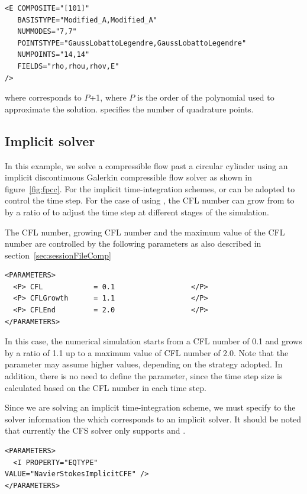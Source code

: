 \begin{lstlisting}[style=XmlStyle]
<E COMPOSITE="[101]"
   BASISTYPE="Modified_A,Modified_A"
   NUMMODES="7,7"
   POINTSTYPE="GaussLobattoLegendre,GaussLobattoLegendre"
   NUMPOINTS="14,14"
   FIELDS="rho,rhou,rhov,E"
/>
\end{lstlisting}

where  corresponds to $P$+1, where $P$ is the order of the polynomial
used to approximate the solution.  specifies the number of quadrature
points.


\subsection{Implicit solver}
In this example, we solve a compressible flow past a circular cylinder using an 
implicit discontinuous Galerkin compressible flow solver as shown in figure~\ref{fig:fpcc}. 
For the implicit time-integration schemes,  or  
can be adopted to control the time step. For the case of using , the CFL number 
can grow from  to  by a ratio of  to adjust 
the time step at different stages of the simulation. 

The CFL number, growing CFL number and the maximum value of the CFL number 
are controlled by the following parameters as also described in section~\ref{sec:sessionFileComp}
\begin{lstlisting}[style=XmlStyle]
<PARAMETERS>
  <P> CFL            = 0.1                  </P>
  <P> CFLGrowth      = 1.1                  </P>
  <P> CFLEnd         = 2.0                  </P>
</PARAMETERS>
\end{lstlisting}
In this case, the numerical simulation starts from a CFL number of 0.1 and grows 
by a ratio of 1.1 up to a maximum value of CFL number of 2.0. Note that the 
 parameter may assume higher values, depending on the strategy 
adopted. In addition, there is no need to define the  parameter, 
since the time step size is calculated based on the CFL number in each time step.

Since we are solving an implicit time-integration scheme, we must specify to 
the solver information the  which corresponds to an implicit solver. 
It should be noted that currently the CFS solver only supports 
 and .
\begin{lstlisting}[style=XmlStyle]
<PARAMETERS>
  <I PROPERTY="EQTYPE"                        VALUE="NavierStokesImplicitCFE" />
</PARAMETERS>
\end{lstlisting}

